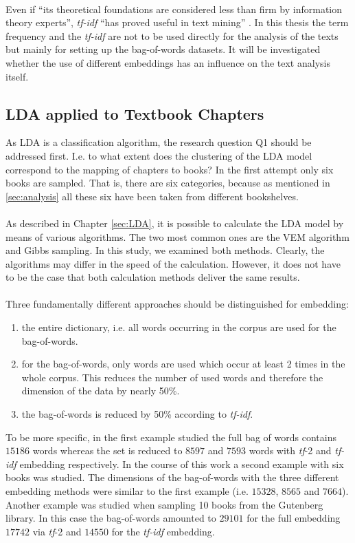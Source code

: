 \documentclass[11pt,a4paper]{article}
\begin{document}
\ \\
Even if “its theoretical foundations are considered less than firm by information theory experts”, \textit{tf-idf} “has proved useful in text mining” \cite{Silge2017}. In this thesis the term frequency and the \textit{tf-idf} are not to be used directly for the analysis of the texts but mainly for setting up the bag-of-words datasets. It will be investigated whether the use of different embeddings has an influence on the text analysis itself.

\subsection{LDA applied to Textbook Chapters} \label{Example1}

As LDA is a classification algorithm, the research question Q1 should be addressed first. I.e. to what extent does the clustering of the LDA model correspond to the mapping of chapters to books? In the first attempt only six books are sampled. That is, there are six categories, because as mentioned in \ref{sec:analysis} all these six have been taken from different bookshelves.\\
\ \\
As described in Chapter \ref{sec:LDA}, it is possible to calculate the LDA model by means of various algorithms. The two most common ones are the VEM algorithm and Gibbs sampling. In this study, we examined both methods. Clearly, the algorithms may differ in the speed of the calculation. However, it does not have to be the case that both calculation methods deliver the same results.\\
\ \\
Three fundamentally different approaches should be distinguished for embedding:
\begin{enumerate}
	\item the entire dictionary, i.e. all words occurring in the corpus are used for the bag-of-words.	
	\item for the bag-of-words, only words are used which occur at least 2 times in the whole corpus. This reduces the number of used words and therefore the dimension of the data by nearly 50\%.
	\item the bag-of-words is reduced by 50\% according to \textit{tf-idf}.
\end{enumerate}
To be more specific, in the first example studied the full bag of words contains $15186$ words whereas the set is reduced to $8597$ and $7593$ words with \textit{tf}-2 and \textit{tf-idf} embedding respectively. In the course of this work a second example with six books was studied. The dimensions of the bag-of-words with the three different embedding methods were similar to the first example (i.e. $15328$, $8565$ and $7664$). Another example was studied when sampling 10 books from the Gutenberg library. In this case the bag-of-words amounted to $29101$ for the full embedding $17742$ via \textit{tf}-2 and $14550$ for the \textit{tf-idf} embedding.\\
\end{document}
